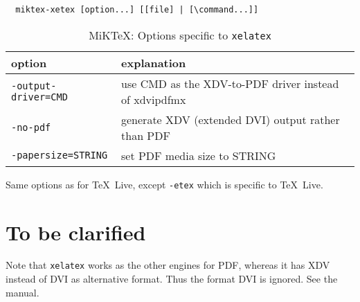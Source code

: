 \documentclass{article}
\newcommand{\xelatex}{\texttt{xelatex}}
\newcommand{\texlive}{\TeX~Live}
\newcommand{\miktex}{MiKTeX}
\begin{document}
  
  
  

\begin{verbatim}
  miktex-xetex [option...] [[file] | [\command...]]
\end{verbatim}



\begin{longtable}{|ll|}
  \toprule
  option & explanation \\
  \midrule
  \midrule
  \endfirsthead%
  \bottomrule
  \caption{\label{tab:latexOptionsXelatexMiktex} \miktex: Options specific to \xelatex{} }
  \endlastfoot%
  \texttt{-output-driver=CMD}      & use CMD as the XDV-to-PDF driver instead of xdvipdfmx \\
  \texttt{-no-pdf}                 & generate XDV (extended DVI) output rather than PDF \\
  \texttt{-papersize=STRING}       & set PDF media size to STRING \\
  \end{longtable}

  Same options as for \texlive, except \texttt{-etex} which is specific to \texlive. 


\section{To be clarified}\label{sec:TBC}

Note that \xelatex{} works as the other engines for PDF, 
whereas it has XDV instead of DVI as alternative format. 
Thus the format DVI is ignored. 
See the manual. 






{}%
\end{document}
